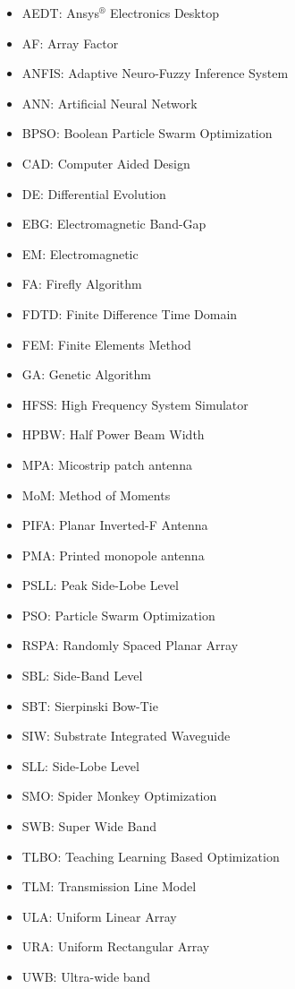 \begin{abbreviation}
\begin{itemize}
\item AEDT: Ansys$^{\circledR}$ Electronics Desktop
\item AF: Array Factor
\item ANFIS: Adaptive Neuro-Fuzzy Inference System
\item ANN: Artificial Neural Network
\item BPSO: Boolean Particle Swarm Optimization
\item CAD: Computer Aided Design
\item DE: Differential Evolution
\item EBG: Electromagnetic Band-Gap
\item EM: Electromagnetic
\item FA: Firefly Algorithm
\item FDTD: Finite Difference Time Domain
\item FEM: Finite Elements Method
\item GA: Genetic Algorithm
\item HFSS: High Frequency System Simulator
\item HPBW: Half Power Beam Width
\item MPA: Micostrip patch antenna
\item MoM: Method of Moments
\item PIFA: Planar Inverted-F Antenna
\item PMA: Printed monopole antenna
\item PSLL: Peak Side-Lobe Level
\item PSO: Particle Swarm Optimization
\item RSPA: Randomly Spaced Planar Array
\item SBL: Side-Band Level
\item SBT: Sierpinski Bow-Tie
\item SIW: Substrate Integrated Waveguide
\item SLL: Side-Lobe Level
\item SMO: Spider Monkey Optimization
\item SWB: Super Wide Band
\item TLBO: Teaching Learning Based Optimization
\item TLM: Transmission Line Model
\item ULA: Uniform Linear Array
\item URA: Uniform Rectangular Array
\item UWB: Ultra-wide band
\end{itemize}
\end{abbreviation} 